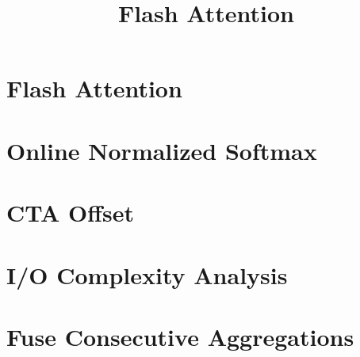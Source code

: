 \documentclass{article}
\title{Flash Attention}
\begin{document}



\noindent
\linespread{1.2}
\selectfont
\setlength{\topskip}{0ex}
\setlength{\parskip}{1ex}
\setlength{\lineskip}{1em}


\section{Flash Attention}


\newpage
\section{Online Normalized Softmax}


\newpage
\section{CTA Offset}


\newpage
\section{I/O Complexity Analysis}


\newpage
\section{Fuse Consecutive Aggregations}



\end{document}
